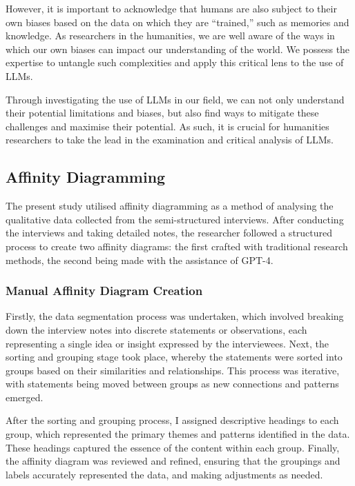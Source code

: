 \documentclass[
]{book}
\begin{document}
However, it is important to acknowledge that humans are also subject to their own biases based on the data on which they are ``trained,'' such as memories and knowledge. As researchers in the humanities, we are well aware of the ways in which our own biases can impact our understanding of the world. We possess the expertise to untangle such complexities and apply this critical lens to the use of LLMs.

Through investigating the use of LLMs in our field, we can not only understand their potential limitations and biases, but also find ways to mitigate these challenges and maximise their potential. As such, it is crucial for humanities researchers to take the lead in the examination and critical analysis of LLMs.

\hypertarget{affinity-diagramming}{%
\subsection{Affinity Diagramming}\label{affinity-diagramming}}

The present study utilised affinity diagramming as a method of analysing the qualitative data collected from the semi-structured interviews. After conducting the interviews and taking detailed notes, the researcher followed a structured process to create two affinity diagrams: the first crafted with traditional research methods, the second being made with the assistance of GPT-4.

\hypertarget{manual-affinity-diagram-creation}{%
\subsubsection{Manual Affinity Diagram Creation}\label{manual-affinity-diagram-creation}}

Firstly, the data segmentation process was undertaken, which involved breaking down the interview notes into discrete statements or observations, each representing a single idea or insight expressed by the interviewees. Next, the sorting and grouping stage took place, whereby the statements were sorted into groups based on their similarities and relationships. This process was iterative, with statements being moved between groups as new connections and patterns emerged.

After the sorting and grouping process, I assigned descriptive headings to each group, which represented the primary themes and patterns identified in the data. These headings captured the essence of the content within each group. Finally, the affinity diagram was reviewed and refined, ensuring that the groupings and labels accurately represented the data, and making adjustments as needed.
\end{document}
